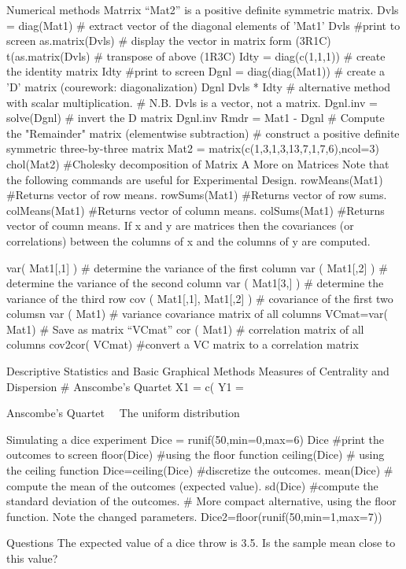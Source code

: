 Numerical methods
Matrrix “Mat2” is a positive definite symmetric matrix.
Dvls = diag(Mat1)		# extract vector of the diagonal elements of 'Mat1'
Dvls				#print to screen
as.matrix(Dvls)			# display the vector in matrix form (3R1C)
t(as.matrix(Dvls)		# transpose of above	(1R3C)
Idty = diag(c(1,1,1))		# create the identity matrix
Idty				#print to screen
Dgnl = diag(diag(Mat1))	# create a 'D' matrix 	(courework: diagonalization)
Dgnl				
Dvls * Idty			# alternative method with scalar multiplication.
				# N.B.  Dvls is a vector, not a matrix.
Dgnl.inv = solve(Dgnl)		# invert the D matrix
Dgnl.inv		
Rmdr = Mat1 - Dgnl		# Compute the "Remainder" matrix (elementwise subtraction)
# construct a positive definite symmetric three-by-three matrix
Mat2 = matrix(c(1,3,1,3,13,7,1,7,6),ncol=3)
chol(Mat2)			#Cholesky decomposition of Matrix A
More on Matrices
Note that the following commands are useful for Experimental Design.
rowMeans(Mat1) 			#Returns vector of row means. 
rowSums(Mat1) 			#Returns vector of row sums.  
colMeans(Mat1) 			#Returns vector of column means.  
colSums(Mat1) 				#Returns vector of coumn means.  
If x and y are matrices then the covariances (or correlations) between the columns of x and the columns of y are computed.


var( Mat1[,1] )			# determine the variance of the first column 
var ( Mat1[,2] )			# determine the variance of the second column
var ( Mat1[3,] )			# determine the variance of the third row
cov ( Mat1[,1], Mat1[,2] )	# covariance of the first two columsn
var ( Mat1)			# variance covariance matrix of all columns
VCmat=var( Mat1)		# Save as matrix “VCmat”
cor ( Mat1)			# correlation matrix of all columns
cov2cor( VCmat)		#convert a VC matrix to a correlation matrix

 
Descriptive Statistics and Basic Graphical Methods
Measures of Centrality and Dispersion
# Anscombe’s  Quartet
X1 = c(
Y1 =
 

Anscombe’s Quartet 
The uniform distribution

Simulating a dice experiment
Dice = runif(50,min=0,max=6)	
Dice				#print the outcomes to screen
floor(Dice)			#using the floor function
ceiling(Dice)			# using the ceiling function
Dice=ceiling(Dice)		#discretize the outcomes.
mean(Dice)			# compute the mean of the outcomes (expected value).
sd(Dice)			#compute the standard deviation of the outcomes.
# More compact alternative, using the floor function. Note the changed parameters.
Dice2=floor(runif(50,min=1,max=7))	

Questions
The expected value of a dice throw is 3.5. Is the sample mean close to this value?

